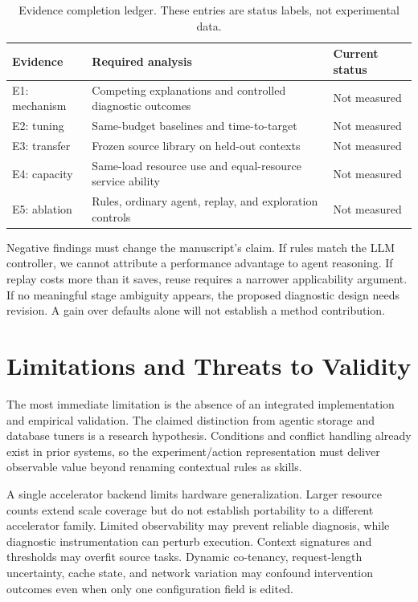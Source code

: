 \documentclass[11pt,a4paper]{article}
\begin{document}
\begin{table}[h]
\centering\small
\begin{tabularx}{\linewidth}{@{}>{\raggedright\arraybackslash}p{24mm}YY@{}}
\toprule
Evidence & Required analysis & Current status \\
\midrule
E1: mechanism & Competing explanations and controlled diagnostic outcomes & Not measured \\
E2: tuning & Same-budget baselines and time-to-target & Not measured \\
E3: transfer & Frozen source library on held-out contexts & Not measured \\
E4: capacity & Same-load resource use and equal-resource service ability & Not measured \\
E5: ablation & Rules, ordinary agent, replay, and exploration controls & Not measured \\
\bottomrule
\end{tabularx}
\caption{Evidence completion ledger. These entries are status labels, not experimental data.}
\end{table}

Negative findings must change the manuscript's claim. If rules match the LLM controller, we cannot attribute a performance advantage to agent reasoning. If replay costs more than it saves, reuse requires a narrower applicability argument. If no meaningful stage ambiguity appears, the proposed diagnostic design needs revision. A gain over defaults alone will not establish a method contribution.

\section{Limitations and Threats to Validity}
The most immediate limitation is the absence of an integrated implementation and empirical validation. The claimed distinction from agentic storage and database tuners is a research hypothesis. Conditions and conflict handling already exist in prior systems, so the experiment/action representation must deliver observable value beyond renaming contextual rules as skills.

A single accelerator backend limits hardware generalization. Larger resource counts extend scale coverage but do not establish portability to a different accelerator family. Limited observability may prevent reliable diagnosis, while diagnostic instrumentation can perturb execution. Context signatures and thresholds may overfit source tasks. Dynamic co-tenancy, request-length uncertainty, cache state, and network variation may confound intervention outcomes even when only one configuration field is edited.
\end{document}
